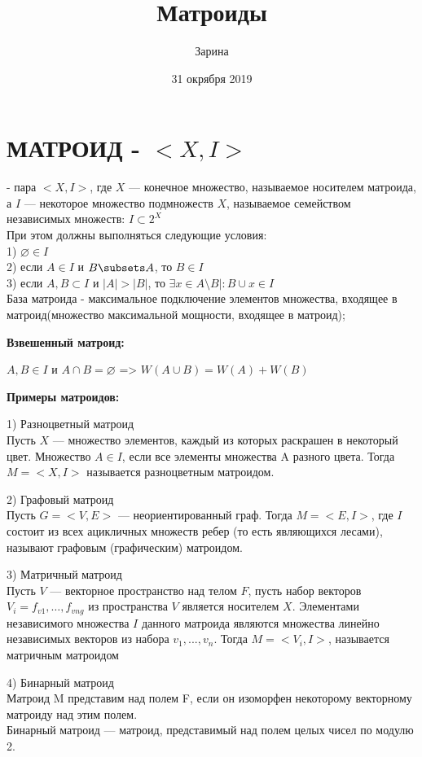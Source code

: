 \documentclass[a4paper,12pt]{article}
\author{Зарина}
\title{Матроиды}
\date{31 окрября 2019}
\begin{document}
\section{МАТРОИД - $<X,I>$}
- пара $<X,I>$, где $X$  — конечное множество, называемое носителем матроида, а $I$ — некоторое множество подмножеств $X$, называемое семейством независимых множеств: $I \subset 2^X$\\
При этом должны выполняться следующие условия:\\
1) $\varnothing \in I$\\
2) если $A \in I$ и $B \subsets A$, то $B \in I$\\
3) если $A,B \subset I$ и $|A|>|B|$, то $ \exists x \in A \setminus B \mid :B\cup x \in I$\\
База матроида - максимальное подключение элементов множества, входящее в матроид(множество максимальной мощности, входящее в матроид);


\textbf{Взвешенный матроид:}

$A,B \in I$ и $A\cap B= \varnothing $ => $W(A\cup B)=W(A)+W(B)$

\textbf{Примеры матроидов:}

1)	Разноцветный матроид\\
Пусть $X$ — множество элементов, каждый из которых раскрашен в некоторый цвет. Множество $A \in I$, если все элементы множества A разного цвета. Тогда $M=<X,I>$ называется разноцветным матроидом.

2)	Графовый матроид\\
Пусть $G=<V,E>$ — неориентированный граф. Тогда $M=<E,I>$, где $I$ состоит из всех ацикличных множеств ребер (то есть являющихся лесами), называют графовым (графическим) матроидом.

3)	Матричный матроид\\
Пусть $V$ — векторное пространство над телом $F$, пусть набор векторов $V_{i}=f_{v1}, …, f_{vng}$ из пространства $V$ является носителем $X$. Элементами независимого множества $I$ данного матроида являются множества линейно независимых векторов из набора $v_{1},..., v_{n}$. Тогда $M=<V_{i},I>$, называется матричным матроидом

4)	Бинарный матроид\\
Матроид M представим над полем F, если он изоморфен некоторому векторному матроиду над этим полем.\\
Бинарный матроид — матроид, представимый над полем целых чисел по модулю 2.
\end{document}
